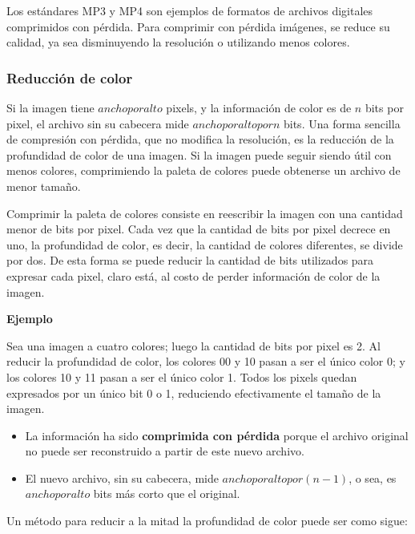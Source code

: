 \documentclass[spanish,A4,]{article}
\begin{document}
Los estándares MP3 y MP4 son ejemplos de formatos de archivos digitales
comprimidos con pérdida. Para comprimir con pérdida imágenes, se reduce
su calidad, ya sea disminuyendo la resolución o utilizando menos
colores.

\subsubsection{Reducción de color}\label{reducciuxf3n-de-color}

Si la imagen tiene $ancho  por  alto$ pixels, y la información de color
es de $n$ bits por pixel, el archivo sin su cabecera mide
$ancho  por  alto  por  n$ bits. Una forma sencilla de compresión con
pérdida, que no modifica la resolución, es la reducción de la
profundidad de color de una imagen. Si la imagen puede seguir siendo
útil con menos colores, comprimiendo la paleta de colores puede
obtenerse un archivo de menor tamaño.

Comprimir la paleta de colores consiste en reescribir la imagen con una
cantidad menor de bits por pixel. Cada vez que la cantidad de bits por
pixel decrece en uno, la profundidad de color, es decir, la cantidad de
colores diferentes, se divide por dos. De esta forma se puede reducir la
cantidad de bits utilizados para expresar cada pixel, claro está, al
costo de perder información de color de la imagen.

\textbf{Ejemplo}

Sea una imagen a cuatro colores; luego la cantidad de bits por pixel es
2. Al reducir la profundidad de color, los colores 00 y 10 pasan a ser
el único color 0; y los colores 10 y 11 pasan a ser el único color 1.
Todos los pixels quedan expresados por un único bit 0 o 1, reduciendo
efectivamente el tamaño de la imagen.

\begin{itemize}
\itemsep1pt\parskip0pt
\item
  La información ha sido \textbf{comprimida con pérdida} porque el
  archivo original no puede ser reconstruido a partir de este nuevo
  archivo.
\item
  El nuevo archivo, sin su cabecera, mide
  $ancho  por  alto  por  (n - 1)$, o sea, es $ancho  por  alto$ bits
  más corto que el original.
\end{itemize}

Un método para reducir a la mitad la profundidad de color puede ser como
sigue:
\end{document}
